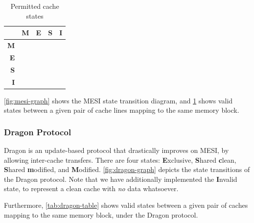 \documentclass[date,tikzlibs,lmodern,10pt]{epreport}
\newcommand{\cmark}{\ding{51}}%
\newcommand{\xmark}{\ding{55}}%
\begin{document}
\begin{table}[htbp]
	\centering\begin{tabular}{r|cccc}
		           & \textbf{M}                  & \textbf{E}                  & \textbf{S}                  & \textbf{I}                  \\ \hline
		\textbf{M} & \textcolor{red}{\xmark{}}   & \textcolor{red}{\xmark{}}   & \textcolor{red}{\xmark{}}   & \textcolor{green}{\cmark{}} \\
		\textbf{E} & \textcolor{red}{\xmark{}}   & \textcolor{red}{\xmark{}}   & \textcolor{red}{\xmark{}}   & \textcolor{green}{\cmark{}} \\
		\textbf{S} & \textcolor{red}{\xmark{}}   & \textcolor{red}{\xmark{}}   & \textcolor{green}{\cmark{}} & \textcolor{green}{\cmark{}} \\
		\textbf{I} & \textcolor{green}{\cmark{}} & \textcolor{green}{\cmark{}} & \textcolor{green}{\cmark{}} & \textcolor{green}{\cmark{}}
	\end{tabular}
	\caption{Permitted cache states }
	\label{tab:mesi-table}
\end{table}

\cref{fig:mesi-graph} shows the MESI state transition diagram, and \cref{tab:mesi-table} shows valid states between a given pair of cache lines mapping to the same memory block.

\subsubsection{Dragon Protocol}
Dragon is an update-based protocol that drastically improves on MESI, by allowing inter-cache transfers.
There are four states: \textbf{E}xclusive, \textbf{S}hared \textbf{c}lean, \textbf{S}hared \textbf{m}odified, and \textbf{M}odified.
\cref{fig:dragon-graph} depicts the state transitions of the Dragon protocol.
Note that we have additionally implemented the \textbf{I}nvalid state, to represent a clean cache with \emph{no} data whatsoever.

Furthermore, \cref{tab:dragon-table} shows valid states between a given pair of caches mapping to the same memory block, under the Dragon protocol.
\end{document}

